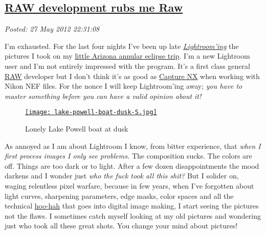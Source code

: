 %

\subsection*{\href{https://bakerjd99.wordpress.com/2012/05/27/raw-development-rubs-me-raw/}{RAW development rubs me Raw}}


\noindent\emph{Posted: 27 May 2012 22:31:08}
\vspace{6pt}

I'm exhausted. For the last four nights I've been up late
\emph{\href{http://www.adobe.com/products/photoshop-lightroom.html}{Lightroom'ing}}
the pictures I took on my
\href{http://conceptcontrol.smugmug.com/Trips/USA-and-Canada/Arizona-Toodling-1/7475075\_MrjqMc}{little
Arizona annular eclipse trip}. I'm a new Lightroom user and I'm not
entirely impressed with the program. It's a first class general
\href{http://en.wikipedia.org/wiki/Raw\_image\_format}{RAW} developer
but I don't think it's as good as
\href{http://www.capturenx.com/en/index.html}{Capture NX} when working
with Nikon NEF files. For the nonce I will keep Lightroom'ing away;
\emph{you have to master something before you can have a valid opinion
about it!}



\captionsetup[figure]{labelformat=empty}
\begin{figure}[htbp]
\centering
\href{http://conceptcontrol.smugmug.com/Trips/USA-and-Canada/Arizona-Toodling-1/7475075\_MrjqMc}{\texttt{[image: lake-powell-boat-dusk-S.jpg]}}
\caption{Lonely Lake Powell boat at dusk}
\label{fig:2865X0}
\end{figure}


As annoyed as I am about Lightroom I know, from bitter experience, that
\emph{when I first process images I only see problems.} The composition
sucks. The colors are off. Things are too dark or to light. After a few
dozen disappointments the mood darkens and I wonder just \emph{who the
fuck took all this shit?} But I solider on, waging relentless pixel
warfare, because in few years, when I've forgotten about light curves,
sharpening parameters, edge masks, color spaces and all the technical
\href{http://www.thefreedictionary.com/hoo-ha}{hoo-hah} that goes into
digital image making, I start seeing the pictures not the flaws. I
sometimes catch myself looking at my old pictures and wondering just who
took all these great shots. You change your mind about pictures!


